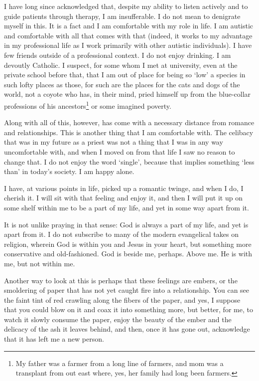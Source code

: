 I have long since acknowledged that, despite my ability to listen actively and to guide patients through therapy, I am insufferable. I do not mean to denigrate myself in this. It is a fact and I am comfortable with my role in life. I am autistic and comfortable with all that comes with that (indeed, it works to my advantage in my professional life as I work primarily with other autistic individuals). I have few friends outside of a professional context. I do not enjoy drinking. I am devoutly Catholic. I suspect, for some whom I met at university, even at the private school before that, that I am out of place for being so `low' a species in such lofty places as those, for such are the places for the cats and dogs of the world, not a coyote who has, in their mind, pried himself up from the blue-collar professions of his ancestors\footnote{My father was a farmer from a long line of farmers, and mom was a transplant from out east where, yes, her family had long been farmers.} or some imagined poverty.

Along with all of this, however, has come with a necessary distance from romance and relationships. This is another thing that I am comfortable with. The celibacy that was in my future as a priest was not a thing that I was in any way uncomfortable with, and when I moved on from that life I saw no reason to change that. I do not enjoy the word `single', because that implies something `less than' in today's society. I am happy alone.

I have, at various points in life, picked up a romantic twinge, and when I do, I cherish it. I will sit with that feeling and enjoy it, and then I will put it up on some shelf within me to be a part of my life, and yet in some way apart from it.

It is not unlike praying in that sense: God is always a part of my life, and yet is apart from it. I do not subscribe to many of the modern evangelical takes on religion, wherein God is within you and Jesus in your heart, but something more conservative and old-fashioned. God is beside me, perhaps. Above me. He is with me, but not within me.

Another way to look at this is perhaps that these feelings are embers, or the smoldering of paper that has not yet caught fire into a relationship. You can see the faint tint of red crawling along the fibers of the paper, and yes, I suppose that you could blow on it and coax it into something more, but better, for me, to watch it slowly consume the paper, enjoy the beauty of the ember and the delicacy of the ash it leaves behind, and then, once it has gone out, acknowledge that it has left me a new person.

